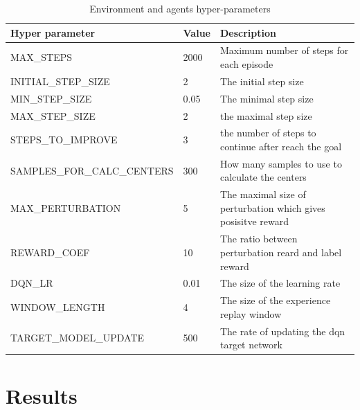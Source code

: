 \documentclass{article}
\begin{document}
\begin{table}[h]
\caption{Environment and agents hyper-parameters}
\label{tab:hyperparam}
\begin{tabular}{|l|l|l|}
\hline
\textbf{Hyper parameter}    & \textbf{Value} & \textbf{Description}                                          \\ \hline
MAX\_STEPS                  & 2000           & Maximum number of steps for each episode                      \\ \hline
INITIAL\_STEP\_SIZE         & 2              & The initial step size                                         \\ \hline
MIN\_STEP\_SIZE             & 0.05           & The minimal step size                                         \\ \hline
MAX\_STEP\_SIZE             & 2              & the maximal step size                                         \\ \hline
STEPS\_TO\_IMPROVE          & 3              & the number of steps to continue after reach the goal          \\ \hline
SAMPLES\_FOR\_CALC\_CENTERS & 300            & How many samples to use to calculate the centers              \\ \hline
MAX\_PERTURBATION           & 5              & The maximal size of perturbation which gives posisitve reward \\ \hline
REWARD\_COEF                & 10             & The ratio between perturbation reard and label reward         \\ \hline
DQN\_LR                     & 0.01           & The size of the learning rate                                 \\ \hline
WINDOW\_LENGTH              & 4              & The size of the experience replay window                      \\ \hline
TARGET\_MODEL\_UPDATE       & 500            & The rate of updating the dqn target network                   \\ \hline
\end{tabular}
\end{table}


\section{Results}
\end{document}
